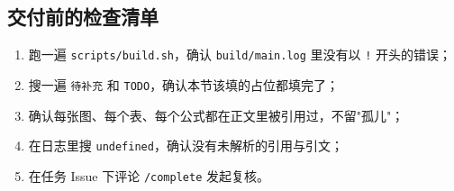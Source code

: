 \subsection{交付前的检查清单}

\begin{enumerate}
  \item 跑一遍 \verb|scripts/build.sh|，确认 \texttt{build/main.log} 里没有以
        \texttt{!} 开头的错误；
  \item 搜一遍 \texttt{待补充} 和 \texttt{TODO}，确认本节该填的占位都填完了；
  \item 确认每张图、每个表、每个公式都在正文里被引用过，不留"孤儿"；
  \item 在日志里搜 \texttt{undefined}，确认没有未解析的引用与引文；
  \item 在任务 Issue 下评论 \verb|/complete| 发起复核。
\end{enumerate}
